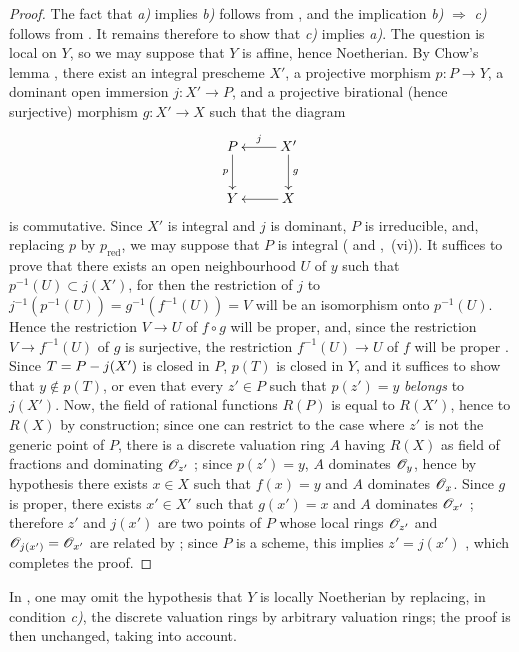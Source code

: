 \begin{proof}
The fact that \emph{a)} implies \emph{b)} follows from , and the implication \emph{b)} $\Rightarrow$ \emph{c)} follows from .
It remains therefore to show that \emph{c)} implies \emph{a)}.
The question is local on $Y$, so we may suppose that $Y$ is affine, hence Noetherian. By Chow's lemma , there exist an integral prescheme $X'$, a projective morphism $p:P\to Y$, a dominant open immersion $j:X'\to P$, and a projective birational (hence surjective) morphism $g:X'\to X$ such that the diagram
\[
  \xymatrix{
    P \ar[d]_-{p} & X' \ar[l]_-{j} \ar[d]^-{g} \\
    Y & X \ar[l]
  }
\]
is commutative.
Since $X'$ is integral and $j$ is dominant, $P$ is irreducible, and, replacing $p$ by $p_\mathrm{red}$, we may suppose that $P$ is integral ( and ,~(vi)).
It suffices to prove that there exists an open neighbourhood $U$ of $y$ such that $p^{-1}(U)\subset j(X')$, for then the restriction of $j$ to $j^{-1}(p^{-1}(U))=g^{-1}(f^{-1}(U))=V$
will be an isomorphism onto $p^{-1}(U)$. Hence the restriction $V\to U$ of $f\circ g$ will be proper, and, since the restriction $V\to f^{-1}(U)$ of $g$ is surjective, the restriction $f^{-1}(U)\to U$ of $f$ will be proper .
Since $T=P- j(X')$ is closed in $P$, $p(T)$ is closed in $Y$, and it suffices to show that $y\notin p(T)$, or even that every $z'\in P$ such that $p(z')=y$ \emph{belongs} to $j(X')$.
Now, the field of rational functions $R(P)$ is equal to $R(X')$, hence to $R(X)$ by construction; since one can restrict to the case where $z'$ is not the generic point of $P$, there is a discrete valuation ring $A$ having $R(X)$ as field of fractions and dominating $\mathscr{O}_{z'}$ ; since $p(z')=y$, $A$ dominates $\mathscr{O}_y$, hence by hypothesis there exists $x\in X$ such that $f(x)=y$ and $A$ dominates $\mathscr{O}_x$.
Since $g$ is proper, there exists $x'\in X'$ such that $g(x')=x$ and $A$ dominates $\mathscr{O}_{x'}$ ; therefore $z'$ and $j(x')$ are two points of $P$ whose local rings $\mathscr{O}_{z'}$ and $\mathscr{O}_{j(x')}=\mathscr{O}_{x'}$ are related by ; since $P$ is a scheme, this implies $z'=j(x')$ , which completes the proof.
\end{proof}

\begin{remark}[15.7.3]
\label{IV.15.7.3}
In , one may omit the hypothesis that $Y$ is locally Noetherian by replacing, in condition \emph{c)}, the discrete valuation rings by arbitrary valuation rings; the proof is then unchanged, taking  into account.
\end{remark}

